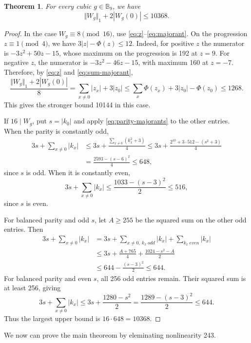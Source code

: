 \documentclass[11pt]{article}
\newtheorem{theorem}{Theorem}
\newtheorem{open problem}{Open problem}
\begin{document}
\begin{theorem}\label{thm:weighted}
For every cubic $g\in \mathbb{B}_9$, we have
\begin{equation}\label{eq:weighted}
{\Vert W_g\Vert }_{1}+2|W_g(0)|\le10368.
\end{equation}
\end{theorem}
\begin{proof}
In the case $W_g\equiv8\pmod{16}$, use \eqref{eq:z}--\eqref{eq:majorant}. On the progression $z\equiv1\pmod4$, we have
$
3|z|-\Phi(z)\le12.
$
Indeed, for positive $z$ the numerator is $-3z^2+50z-15$, whose maximum on the progression is 192 at $z=9$. For negative $z$, the numerator is $-3z^2-46z-15$, with maximum 160 at $z=-7$. Therefore, by \eqref{eq:z} and \eqref{eq:sum-majorant},
\[
\frac{{\Vert W_g\Vert }_{1}+2|W_g(0)|}{8}=\sum_{x\neq0} |z_x|+3|z_0|
\le\sum_x\Phi(z_x)+3|z_0|-\Phi(z_0)\le1268.
\]
This gives the stronger bound 10144 in this case.

If $16\mid W_g$, put $s=|k_0|$ and apply \eqref{eq:parity-majorants} to the other entries. When the parity is constantly odd,
\begin{align*}
3s+\sum_{x\ne0}|k_x|
&\le 3s+\frac{\sum_{x\ne0}(k_x^2+3)}{4}\le3s+\frac{2^{10}+3\cdot512-(s^2+3)}{4}\\
&=\frac{2593-(s-6)^2}{4}\le648,
\end{align*}
since $s$ is odd. When it is constantly even,
\[
3s+\sum_{x\ne0}|k_x|
\le\frac{1033-(s-3)^2}{2}\le516,
\]
since $s$ is even.

For balanced parity and odd $s$, let $A\ge255$ be the squared sum on the other odd entries. Then
\begin{align*}
3s+\sum_{x\ne0}|k_x|&=3s+\sum_{x\ne0,\ k_x\ odd}|k_x|+\sum_{k_x\ even}|k_x|\\
&\le3s+\frac{A+765}{4}+\frac{1024-s^2-A}{2}\\
&\le644-\frac{(s-3)^2}{2}\le644.
\end{align*}
For balanced parity and even $s$, all 256 odd entries remain. Their squared sum is at least 256, giving
\[
3s+\sum_{x\ne0}|k_x|
\le3s+\frac{1280-s^2}{2}
=\frac{1289-(s-3)^2}{2}\le644.
\]
Thus the largest upper bound is $16\cdot648=10368$.
\end{proof}

We now can prove the main theoreom by eleminating nonlinearity 243.
\end{document}
